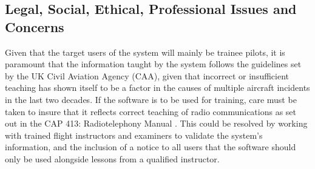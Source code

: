 \subsection{Legal, Social, Ethical, Professional Issues and Concerns}
Given that the target users of the system will mainly be trainee pilots, it is paramount that the information taught by the system follows the guidelines set by the UK Civil Aviation Agency (CAA), given that incorrect or insufficient teaching has shown itself to be a factor in the causes of multiple aircraft incidents in the last two decades. If the software is to be used for training, care must be taken to insure that it reflects correct teaching of radio communications as set out in the CAP 413: Radiotelephony Manual \cite{CAP413}. This could be resolved by working with trained flight instructors and examiners to validate the system's information, and the inclusion of a notice to all users that the software should only be used alongside lessons from a qualified instructor.